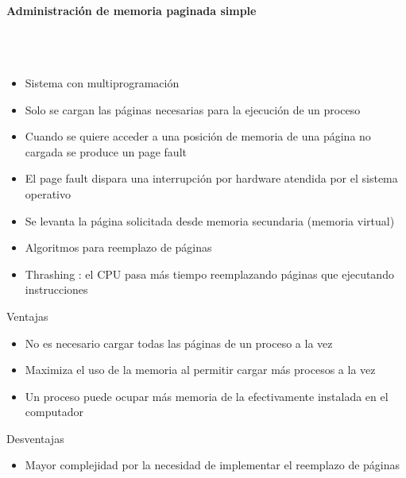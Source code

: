 \paragraph{Administración de memoria paginada simple}\mbox{}\\\\%
\begin{itemize}
\item Sistema con multiprogramación
\item Solo se cargan las páginas necesarias para la ejecución de un proceso
\item Cuando se quiere acceder a una posición de memoria de una página no cargada se produce un page fault
\item El page fault dispara una interrupción por hardware atendida por el sistema operativo
\item Se levanta la página solicitada desde memoria secundaria (memoria virtual)
\item Algoritmos para reemplazo de páginas
\item Thrashing : el CPU pasa más tiempo reemplazando páginas que ejecutando instrucciones
\end{itemize}
Ventajas
\begin{itemize}
\item No es necesario cargar todas las páginas de un proceso a la vez
\item Maximiza el uso de la memoria al permitir cargar más procesos a la vez
\item Un proceso puede ocupar más memoria de la efectivamente instalada en el computador
\end{itemize}
Desventajas
\begin{itemize}
\item Mayor complejidad por la necesidad de implementar el reemplazo de páginas
\end{itemize}

